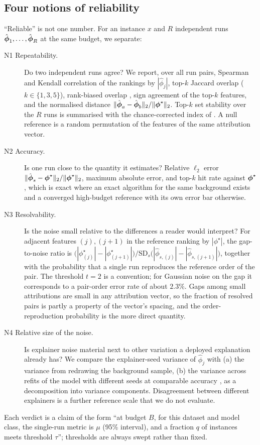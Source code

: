 \subsection{Four notions of reliability}
``Reliable'' is not one number. For an instance $x$ and $R$ independent runs $\hat{\boldsymbol{\phi}}_1,\dots,\hat{\boldsymbol{\phi}}_R$ at the same budget, we separate:
\begin{description}
\item[N1 Repeatability.] Do two independent runs agree? We report, over all run pairs, Spearman and Kendall correlation of the rankings by $|\hat\phi_j|$, top-$k$ Jaccard overlap ($k\in\{1,3,5\}$), rank-biased overlap \citep{webber2010rbo}, sign agreement of the top-$k$ features, and the normalised distance $\|\hat{\boldsymbol{\phi}}_a-\hat{\boldsymbol{\phi}}_b\|_2/\|\boldsymbol{\phi}^\star\|_2$. Top-$k$ set stability over the $R$ runs is summarised with the chance-corrected index of \citet{nogueira2018stability}. A null reference is a random permutation of the features of the same attribution vector.
\item[N2 Accuracy.] Is one run close to the quantity it estimates? Relative $\ell_2$ error $\|\hat{\boldsymbol{\phi}}_s-\boldsymbol{\phi}^\star\|_2/\|\boldsymbol{\phi}^\star\|_2$, maximum absolute error, and top-$k$ hit rate against $\boldsymbol{\phi}^\star$, which is exact where an exact algorithm for the same background exists and a converged high-budget reference with its own error bar otherwise.
\item[N3 Resolvability.] Is the noise small relative to the differences a reader would interpret? For adjacent features $(j),(j{+}1)$ in the reference ranking by $|\phi^\star|$, the gap-to-noise ratio is $\big(|\phi^\star_{(j)}|-|\phi^\star_{(j+1)}|\big)\big/\mathrm{SD}_s\big(|\hat\phi_{s,(j)}|-|\hat\phi_{s,(j+1)}|\big)$, together with the probability that a single run reproduces the reference order of the pair. The threshold $t{=}2$ is a convention; for Gaussian noise on the gap it corresponds to a pair-order error rate of about $2.3\%$. Gaps among small attributions are small in any attribution vector, so the fraction of resolved pairs is partly a property of the vector's spacing, and the order-reproduction probability is the more direct quantity.
\item[N4 Relative size of the noise.] Is explainer noise material next to other variation a deployed explanation already has? We compare the explainer-seed variance of $\hat\phi_j$ with (a) the variance from redrawing the background sample, (b) the variance across refits of the model with different seeds at comparable accuracy \citep{marx2020predictive}, as a decomposition into variance components. Disagreement between different explainers \citep{krishna2024disagreement} is a further reference scale that we do not evaluate.
\end{description}
Each verdict is a claim of the form ``at budget $B$, for this dataset and model class, the single-run metric is $\mu$ (95\% interval), and a fraction $q$ of instances meets threshold $\tau$''; thresholds are always swept rather than fixed.

